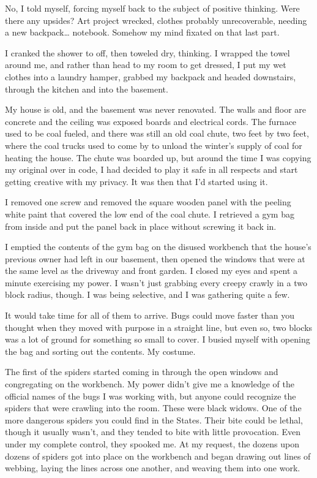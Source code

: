 No, I told myself, forcing myself back to the subject of positive thinking. Were there any upsides? Art project wrecked, clothes probably unrecoverable, needing a new backpack\ldots{} notebook. Somehow my mind fixated on that last part.

I cranked the shower to off, then toweled dry, thinking. I wrapped the towel around me, and rather than head to my room to get dressed, I put my wet clothes into a laundry hamper, grabbed my backpack and headed downstairs, through the kitchen and into the basement.

My house is old, and the basement was never renovated. The walls and floor are concrete and the ceiling was exposed boards and electrical cords. The furnace used to be coal fueled, and there was still an old coal chute, two feet by two feet, where the coal trucks used to come by to unload the winter's supply of coal for heating the house. The chute was boarded up, but around the time I was copying my original  over in code, I had decided to play it safe in all respects and start getting creative with my privacy. It was then that I'd started using it.

I removed one screw and removed the square wooden panel with the peeling white paint that covered the low end of the coal chute. I retrieved a gym bag from inside and put the panel back in place without screwing it back in.

I emptied the contents of the gym bag on the disused workbench that the house's previous owner had left in our basement, then opened the windows that were at the same level as the driveway and front garden. I closed my eyes and spent a minute exercising my power. I wasn't just grabbing every creepy crawly in a two block radius, though. I was being selective, and I was gathering quite a few.

It would take time for all of them to arrive. Bugs could move faster than you thought when they moved with purpose in a straight line, but even so, two blocks was a lot of ground for something so small to cover. I busied myself with opening the bag and sorting out the contents. My costume.

The first of the spiders started coming in through the open windows and congregating on the workbench. My power didn't give me a knowledge of the official names of the bugs I was working with, but anyone could recognize the spiders that were crawling into the room. These were black widows. One of the more dangerous spiders you could find in the States. Their bite could be lethal, though it usually wasn't, and they tended to bite with little provocation. Even under my complete control, they spooked me. At my request, the dozens upon dozens of spiders got into place on the workbench and began drawing out lines of webbing, laying the lines across one another, and weaving them into one work.

